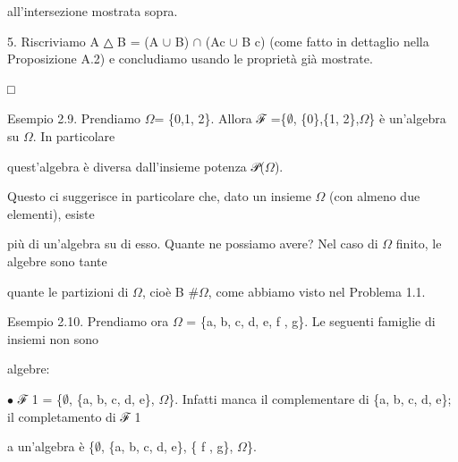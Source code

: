 \documentclass[a4paper,portrait,12pt]{article}
\begin{document}
\begin{flushleft}
all'intersezione mostrata sopra.
\end{flushleft}


\begin{flushleft}
5. Riscriviamo A △ B = (A $\cup$ B) $\cap$ (Ac $\cup$ B c) (come fatto in dettaglio nella Proposizione A.2) e concludiamo usando le propriet\`{a} gi\`{a} mostrate.
\end{flushleft}


□


\begin{flushleft}
Esempio 2.9. Prendiamo $\Omega$= \{0,1, 2\}. Allora ℱ =\{$\emptyset$, \{0\},\{1, 2\},$\Omega$\} \`{e} un'algebra su $\Omega$. In particolare
\end{flushleft}


\begin{flushleft}
quest'algebra \`{e} diversa dall'insieme potenza 𝒫($\Omega$).
\end{flushleft}


\begin{flushleft}
Questo ci suggerisce in particolare che, dato un insieme $\Omega$ (con almeno due elementi), esiste
\end{flushleft}


\begin{flushleft}
più di un'algebra su di esso. Quante ne possiamo avere? Nel caso di $\Omega$ finito, le algebre sono tante
\end{flushleft}


\begin{flushleft}
quante le partizioni di $\Omega$, cio\`{e} B \#$\Omega$, come abbiamo visto nel Problema 1.1.
\end{flushleft}


\begin{flushleft}
Esempio 2.10. Prendiamo ora $\Omega$ = \{a, b, c, d, e, f , g\}. Le seguenti famiglie di insiemi non sono
\end{flushleft}


\begin{flushleft}
algebre:
\end{flushleft}


\begin{flushleft}
$\bullet$ ℱ 1 = \{$\emptyset$, \{a, b, c, d, e\}, $\Omega$\}. Infatti manca il complementare di \{a, b, c, d, e\}; il completamento di ℱ 1
\end{flushleft}


\begin{flushleft}
a un'algebra \`{e} \{$\emptyset$, \{a, b, c, d, e\}, \{ f , g\}, $\Omega$\}.
\end{flushleft}
\end{document}
